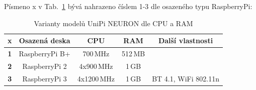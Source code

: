 \begin{table}[!ht]
\caption{Porovnání modelů UniPi NEURON dle I/O \cite{UniPiBoard2}}
\vspace{-20pt}
\label{TableUnipiIO}
	\begin{center}
	\end{center}
\end{table}

\newpage
Písmeno x v Tab.~\ref{TableUnipiVar} bývá nahrazeno číslem 1-3 dle osazeného typu RaspberryPi:

\begin{table}[!ht]
\caption{Varianty modelů UniPi NEURON dle CPU a RAM \cite{UniPiBoard2}}
\vspace{-10pt}
\label{TableUnipiVar}
	\begin{center}
\begin{tabular}{|c|c|c|c|c|}
\hline
x & \textbf{Osazená deska} & \textbf{CPU} & \textbf{RAM} & \textbf{Další vlastnosti} \\ \hline \hline
\textbf{1} & RaspberryPi B+ & 700\,MHz & 512\,MB &  \\ \hline
\textbf{2} & RaspberryPi 2 & 4x900\,MHz & 1\,GB &  \\ \hline
\textbf{3} & RaspberryPi 3 & 4x1200\,MHz & 1\,GB & BT 4.1, WiFi 802.11n \\ \hline \hline
\end{tabular}
	\end{center}
\end{table}

